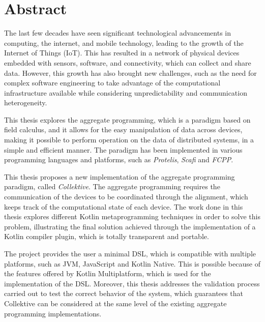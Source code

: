 \chapter*{Abstract}

The last few decades have seen significant technological advancements in computing, the internet, and mobile technology, leading to the growth of the Internet of Things (IoT). This has resulted in a network of physical devices embedded with sensors, software, and connectivity, which can collect and share data. However, this growth has also brought new challenges, such as the need for complex software engineering to take advantage of the computational infrastructure available while considering unpredictability and communication heterogeneity.

This thesis explores the aggregate programming, which is a paradigm based on field calculus,  and it allows for the easy manipulation of data across devices, making it possible to perform operation on the data of distributed systems, in a simple and efficient manner. The paradigm has been implemented in various programming languages and platforms, such as \textit{Protelis}, \textit{Scafi} and \textit{FCPP}.

This thesis proposes a new implementation of the aggregate programming paradigm, called \textit{Collektive}.\newline
The aggregate programming requires the communication of the devices to be coordinated through the alignment, which keeps track of the computational state of each device. The work done in this thesis explores different Kotlin metaprogramming techniques in order to solve this problem, illustrating the final solution achieved through the implementation of a Kotlin compiler plugin, which is totally transparent and portable.

The project provides the user a minimal DSL, which is compatible with multiple platforms, such as JVM, JavaScript and Kotlin Native. This is possible because of the features offered by Kotlin Multiplatform, which is used for the implementation of the DSL.
Moreover, this thesis addresses the validation process carried out to test the correct behavior of the system, which guarantees that Collektive can be considered at the same level of the existing aggregate programming implementations.
